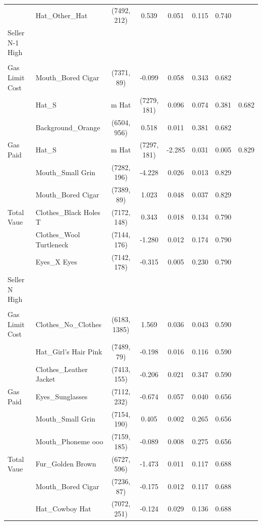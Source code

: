 \begin{table}
\begin{tabular}{llccccc}
 & Hat\_Other\_Hat & (7492, 212) & 0.539 & 0.051 & 0.115 & 0.740 \\
Seller N-1 High &  &  &  &  &  &  \\
 &  &  &  &  &  &  \\
Gas Limit Cost & Mouth\_Bored Cigar & (7371, 89) & -0.099 & 0.058 & 0.343 & 0.682 \\
 & Hat\_S&m Hat & (7279, 181) & 0.096 & 0.074 & 0.381 & 0.682 \\
 & Background\_Orange & (6504, 956) & 0.518 & 0.011 & 0.381 & 0.682 \\
Gas Paid & Hat\_S&m Hat & (7297, 181) & -2.285 & 0.031 & 0.005 & 0.829 \\
 & Mouth\_Small Grin & (7282, 196) & -4.228 & 0.026 & 0.013 & 0.829 \\
 & Mouth\_Bored Cigar & (7389, 89) & 1.023 & 0.048 & 0.037 & 0.829 \\
Total Vaue & Clothes\_Black Holes T & (7172, 148) & 0.343 & 0.018 & 0.134 & 0.790 \\
 & Clothes\_Wool Turtleneck & (7144, 176) & -1.280 & 0.012 & 0.174 & 0.790 \\
 & Eyes\_X Eyes & (7142, 178) & -0.315 & 0.005 & 0.230 & 0.790 \\
Seller N High &  &  &  &  &  &  \\
 &  &  &  &  &  &  \\
Gas Limit Cost & Clothes\_No\_Clothes & (6183, 1385) & 1.569 & 0.036 & 0.043 & 0.590 \\
 & Hat\_Girl's Hair Pink & (7489, 79) & -0.198 & 0.016 & 0.116 & 0.590 \\
 & Clothes\_Leather Jacket & (7413, 155) & -0.206 & 0.021 & 0.347 & 0.590 \\
Gas Paid & Eyes\_Sunglasses & (7112, 232) & -0.674 & 0.057 & 0.040 & 0.656 \\
 & Mouth\_Small Grin & (7154, 190) & 0.405 & 0.002 & 0.265 & 0.656 \\
 & Mouth\_Phoneme  ooo & (7159, 185) & -0.089 & 0.008 & 0.275 & 0.656 \\
Total Vaue & Fur\_Golden Brown & (6727, 596) & -1.473 & 0.011 & 0.117 & 0.688 \\
 & Mouth\_Bored Cigar & (7236, 87) & -0.175 & 0.012 & 0.117 & 0.688 \\
 & Hat\_Cowboy Hat & (7072, 251) & -0.124 & 0.029 & 0.136 & 0.688 \\
\bottomrule
\end{tabular}
\end{table}
